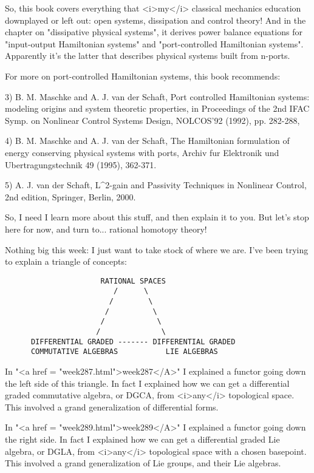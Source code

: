 So, this book covers everything that <i>my</i> classical mechanics
education downplayed or left out: open systems, dissipation and
control theory!  And in the chapter on "dissipative physical
systems", it derives power balance equations for
"input-output Hamiltonian systems" and "port-controlled
Hamiltonian systems".  Apparently it's the latter that describes
physical systems built from n-ports.  

For more on port-controlled Hamiltonian systems, this book recommends:

3) B. M. Maschke and A. J. van der Schaft, Port controlled Hamiltonian
systems: modeling origins and system theoretic properties, in
Proceedings of the 2nd IFAC Symp. on Nonlinear Control Systems Design,
NOLCOS'92 (1992), pp. 282-288,

4) B. M. Maschke and A. J. van der Schaft, The Hamiltonian formulation
of energy conserving physical systems with ports, Archiv fur
Elektronik und Ubertragungstechnik 49 (1995), 362-371.

5) A. J. van der Schaft, L^{2}-gain and Passivity Techniques in
Nonlinear Control, 2nd edition, Springer, Berlin, 2000.

So, I need I learn more about this stuff, and then explain it to you.
But let's stop here for now, and turn to... rational homotopy theory!

Nothing big this week: I just want to take stock of where we are.
I've been trying to explain a triangle of concepts:

\begin{verbatim}
                      RATIONAL SPACES
                         /      \  
                        /        \  
                       /          \  
                      /            \
                     /              \
      DIFFERENTIAL GRADED ------- DIFFERENTIAL GRADED
      COMMUTATIVE ALGEBRAS           LIE ALGEBRAS
\end{verbatim}
    

In "<a href = "week287.html">week287</A>" I explained a
functor going down the left side of this triangle.  In fact I
explained how we can get a differential graded commutative algebra, or
DGCA, from <i>any</i> topological space.  This involved a grand
generalization of differential forms.

In "<a href = "week289.html">week289</A>" I explained a
functor going down the right side.  In fact I explained how we can get
a differential graded Lie algebra, or DGLA, from <i>any</i>
topological space with a chosen basepoint.  This involved a grand
generalization of Lie groups, and their Lie algebras.

